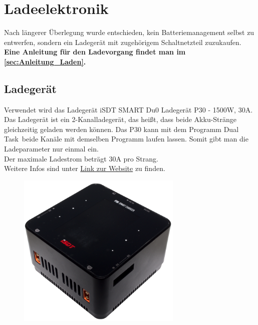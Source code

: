 \section{Ladeelektronik}
Nach längerer Überlegung wurde entschieden, kein Batteriemanagement selbst zu entwerfen, sondern ein Ladegerät mit zugehörigem Schaltnetzteil zuzukaufen. \\

\textbf{Eine Anleitung für den Ladevorgang findet man im \autoref{sec:Anleitung_Laden}.}


\subsection{Ladegerät}
Verwendet wird das Ladegerät \glqq iSDT SMART Du0 Ladegerät P30 - 1500W, 30A\grqq. Das Ladegerät ist ein 2-Kanalladegerät, das heißt, 
dass beide Akku-Stränge gleichzeitig geladen werden können. 
Das P30 kann mit dem Programm \glqq Dual Task\grqq\ beide Kanäle mit demselben Programm laufen lassen. Somit gibt man die Ladeparameter nur einmal ein. \\
Der maximale Ladestrom beträgt 30$\mathrm{A}$ pro Strang. \\
Weitere Infos sind unter \href{https://www.modell-hubschrauber.at/Ladegeraete-Netzteile-Ladekabel-und-Zubehoer/Ladegeraete/Ladegeraete-12Volt/iSDT-SMART-Dup-Ladegeraet-P30-1500W-30A-8S-Lipo::43075.html}{Link zur Website} 
zu finden. 

\begin{figure}[H]
    \centering
    \includegraphics[width=0.7\textwidth]{Fotos/SP30_DSC_8784.png}
\end{figure}

